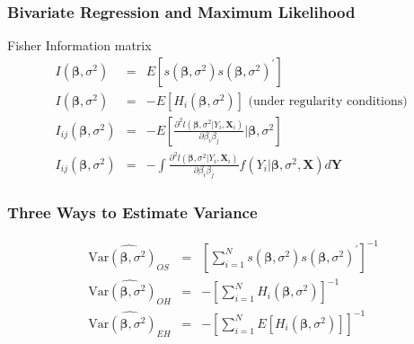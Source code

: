 \documentclass{beamer}
\begin{document}
\begin{frame}
\frametitle{Bivariate Regression and Maximum Likelihood}

Fisher Information matrix
\begin{eqnarray}
I(\boldsymbol{\beta}, \sigma^2) & = & E[ s( \boldsymbol{\beta}, \sigma^2 ) s(\boldsymbol{\beta}, \sigma^2 )^{'}] \nonumber \\
I(\boldsymbol{\beta}, \sigma^2) & = & -E[ H_{i} (\boldsymbol{\beta}, \sigma^2)]  \text{ (under regularity conditions) }\nonumber \\
I_{ij}(\boldsymbol{\beta}, \sigma^2) & = & -E[\frac{\partial^2 l(\boldsymbol{\beta}, \sigma^2| Y_{i} , \boldsymbol{X}_{i})}{\partial \beta_{i} \beta_{j} }| \boldsymbol{\beta}, \sigma^2] \nonumber \\
I_{ij}(\boldsymbol{\beta}, \sigma^2) & = & -\int \frac{\partial^2 l(\boldsymbol{\beta}, \sigma^2| Y_{i}, \boldsymbol{X}_{i})}{\partial \beta_{i} \beta_{j} } f(Y_{i}|\boldsymbol{\beta}, \sigma^2, \boldsymbol{X} )d\boldsymbol{Y} \nonumber
\end{eqnarray}
\end{frame}


\begin{frame}
\frametitle{Three Ways to Estimate Variance}

\begin{eqnarray}
\widehat{\text{Var}(\boldsymbol{\beta}, \sigma^2)_{OS}} & = & \left[\sum_{i=1}^{N}  s(\boldsymbol{\beta}, \sigma^2 ) s( \boldsymbol{\beta}, \sigma^2 )^{'}\right]^{-1} \nonumber \\
\widehat{\text{Var}(\boldsymbol{\beta}, \sigma^2)_{OH}} & = & - \left[\sum_{i=1}^{N} H_{i}(\boldsymbol{\beta}, \sigma^2)\right]^{-1}  \nonumber \\
\widehat{\text{Var}(\boldsymbol{\beta}, \sigma^2)_{EH}} & = & - \left[\sum_{i=1}^{N} E[H_{i}(\boldsymbol{\beta}, \sigma^2) ]\right]^{-1}\nonumber
\end{eqnarray}



\end{frame}
\end{document}
